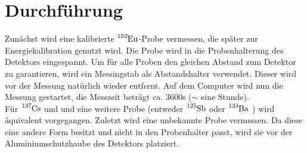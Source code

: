 \section{Durchführung}
\label{sec:Durchführung}
Zunächst wird eine kalibrierte $\ce{^{152}Eu}$-Probe vermessen, die später zur Energiekalibration
genutzt wird. Die Probe wird in die Probenhalterung des Detektors eingespannt. Um für alle
Proben den gleichen Abstand zum Detektor zu garantieren, wird ein Messingstab als Abstandshalter
verwendet. Dieser wird vor der Messung natürlich wieder entfernt.
Auf dem Computer wird nun die Messung gestartet, die Messzeit beträgt ca. 3600\;s ($\sim$ eine Stunde).\\
Für $\ce{^{137}Cs}$ und und eine weitere Probe (entweder $\ce{^{125}Sb}$ oder $\ce{^{133}Ba}$ )
wird äquivalent vorgegangen. Zuletzt wird eine unbekannte Probe vermessen. Da diese eine andere
Form besitzt und nicht in den Probenhalter passt, wird sie vor der Aluminiumschutzhaube des Detektors
platziert.
